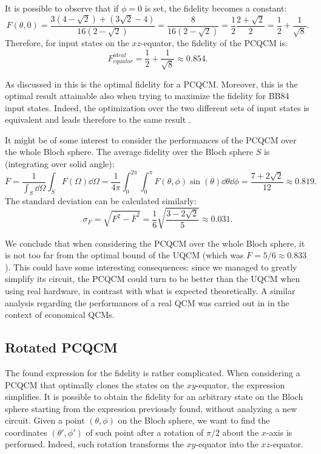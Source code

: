 It is possible to observe that if $\phi=0$ is set, the fidelity becomes a constant:
\[
    F(\theta,0)=\frac{3\left(4-\sqrt{2}\right)+\left(3\sqrt{2}-4\right)}{16(2-\sqrt{2})}=\frac{8}{16(2-\sqrt{2})}=\frac{1}{2}\frac{2+\sqrt{2}}{2}=\frac{1}{2}+\frac{1}{\sqrt{8}}.
\]
Therefore, for input states on the $xz$-equator, the fidelity of the PCQCM is:
\begin{equation}
    F_{equator}^{ideal}=\frac{1}{2}+\frac{1}{\sqrt{8}}\approx 0.854.
    \label{eqn:fidelity_pcqcm}
\end{equation}

As discussed in \cite{PhaseCovariantOptimalBruss} this is the optimal fidelity for a PCQCM. 
Moreover, this is the optimal result attainable also when trying to maximize the fidelity for BB84 input states.
Indeed, the optimization over the two different sets of input states is equivalent and leads therefore to the same result \cite{PhaseCovariantOptimalBruss}.

It might be of some interest to consider the performances of the PCQCM over the whole Bloch sphere.
The average fidelity over the Bloch sphere $S$ is (integrating over solid angle):
\begin{equation}
    \overline{F}=\frac{1}{\int_S \dd{\Omega}}\int_S F(\Omega)\dd{\Omega}=\frac{1}{4\pi}\int_0^{2\pi}\int_0^\pi F(\theta,\phi)\sin(\theta)\dd{\theta}\dd{\phi}=\frac{7+2\sqrt{2}}{12}\approx 0.819.
    \label{eqn:avg_fidelity_pcqcm}
\end{equation}
The standard deviation can be calculated similarly:
\begin{equation}
    \sigma_{F}=\sqrt{\overline{F^2}-\overline{F}^2}=\frac{1}{6}\sqrt{\frac{3-2\sqrt{2}}{5}}\approx0.031.
    \label{eqn:std_fidelity_pcqcm}
\end{equation}

We conclude that when considering the PCQCM over the whole Bloch sphere, it is not too far from the optimal bound of the UQCM (which was $F=5/6\approx 0.833$).
This could have some interesting consequences: since we managed to greatly simplify its circuit, the PCQCM could turn to be better than the UQCM when using real hardware, in contrast with what is expected theoretically.
A similar analysis regarding the performances of a real QCM was carried out in \cite{LowCostCloning} in the context of economical QCMs.

\subsection*{Rotated PCQCM}
The found expression for the fidelity is rather complicated. When considering a PCQCM that optimally clones the states on the $xy$-equator, the expression simplifies.
It is possible to obtain the fidelity for an arbitrary state on the Bloch sphere starting from the expression previously found, without analyzing a new circuit.
Given a point $(\theta,\phi)$ on the Bloch sphere, we want to find the coordinates $(\theta',\phi')$ of such point after a rotation of $\pi/2$ about the $x$-axis is performed.
Indeed, such rotation transforms the $xy$-equator into the $xz$-equator.

